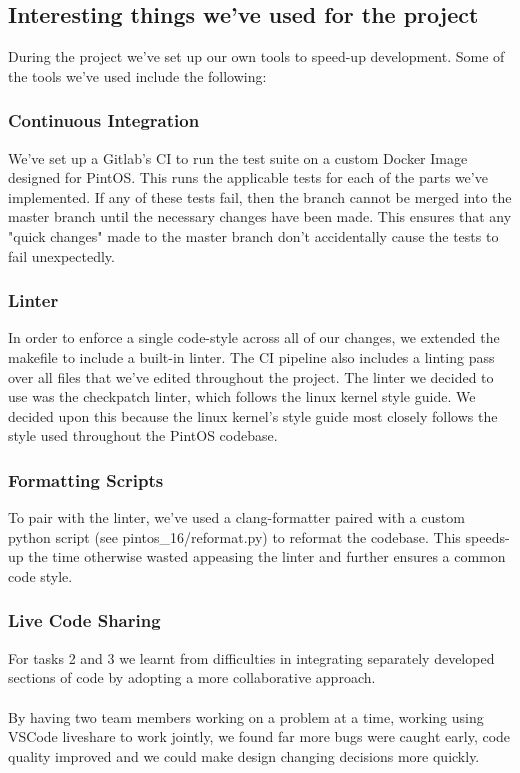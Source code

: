 \documentclass{report}
\begin{document}
		\subsection*{Interesting things we've used for the project}
		During the project we've set up our own tools to speed-up development. Some
		of the tools we've used include the following:

			\subsubsection*{Continuous Integration}
			We've set up a Gitlab's CI to run the test suite on a custom Docker Image 
			designed for PintOS. This runs the applicable tests for
			each of the parts we've implemented. If any of these tests fail, then the 
			branch cannot be merged into the master branch until the
			necessary changes have been made. This ensures that any "quick changes" 
			made to the master branch don't accidentally cause the tests
			to fail unexpectedly.
			
			\subsubsection*{Linter}
			In order to enforce a single code-style across all of our changes, we 
			extended the makefile to include a built-in linter. The CI pipeline also 
			includes a linting pass over all files that we've edited throughout the 
			project. The linter we decided to use was the checkpatch linter, which 
			follows the linux kernel style guide. We decided upon this because the 
			linux kernel's style guide most closely follows the style used throughout 
			the PintOS codebase. 
			
			\subsubsection*{Formatting Scripts}
			To pair with the linter, we've used a clang-formatter paired with a custom 
			python script (see pintos\_16/reformat.py) to reformat the codebase. This 
			speeds-up the time otherwise wasted appeasing the linter and further ensures
			a common code style.

			\subsubsection*{Live Code Sharing}
			For tasks 2 and 3 we learnt from difficulties in integrating 
			separately developed sections of code by adopting a more 
			collaborative approach.
			\\
			\\ By having two team members working on a problem at a time, 
			working using VSCode liveshare to work jointly, we found far more 
			bugs were caught early, code quality improved and we 
			could make design changing decisions more quickly.
\end{document}
